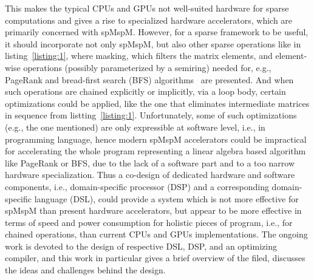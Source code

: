 \documentclass[10pt,conference]{IEEEtran}
\begin{document}
This makes the typical CPUs and GPUs not well-suited hardware for sparse computations and gives a rise to specialized hardware accelerators, which are primarily concerned with spMspM.
However, for a sparse framework to be useful, it should incorporate not only spMspM, but also other sparse operations like in listing~\ref{listing:1}, where masking, which filters the matrix elements, and element-wise operations (possibly parameterized by a semiring) needed for, e.g., PageRank and bread-first search (BFS) algorithms~\cite{yang2020graphblast} are presented.
And when such operations are chained explicitly or implicitly, via a loop body, certain optimizations could be applied, like the one that eliminates intermediate matrices in sequence from listting~\ref{listing:1}.
Unfortunately, some of such optimizations (e.g., the one mentioned) are only expressible at software level, i.e., in programming language, hence modern spMspM accelerators could be impractical for accelerating the whole program representing a linear algebra based algorithm like PageRank or BFS, due to the lack of a software part and to a too narrow hardware specialization.
Thus a co-design of dedicated hardware and software components, i.e., domain-specific processor (DSP) and a corresponding domain-specific language (DSL), could provide a system which is not more effective for spMspM than present hardware accelerators, but appear to be more effective in terms of speed and power consumption for holistic pieces of program, i.e., for chained operations, than current CPUs and GPUs implementations.
The ongoing work is devoted to the design of respective DSL, DSP, and an optimizing compiler, and this work in particular gives a brief overview of the filed, discusses the ideas and challenges behind the design. 




\end{document}
